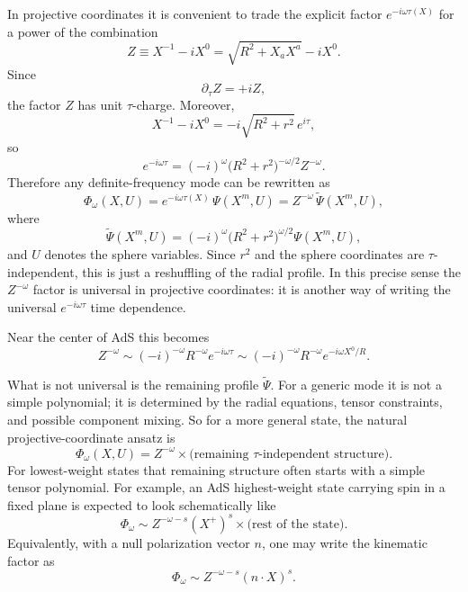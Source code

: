 \documentclass[12pt]{article}
\begin{document}
In projective coordinates it is convenient to trade the explicit factor $e^{-i\omega\tau(X)}$ for a power
of the combination
\begin{equation}
Z\equiv X^{-1}-iX^0=\sqrt{R^2+X_aX^a}-iX^0.
\end{equation}
Since
\begin{equation}
\partial_\tau Z=+iZ,
\end{equation}
the factor $Z$ has unit $\tau$-charge.  Moreover,
\begin{equation}
X^{-1}-iX^0=-i\sqrt{R^2+r^2}\,e^{i\tau},
\end{equation}
so
\begin{equation}
e^{-i\omega\tau}
=
(-i)^\omega \big(R^2+r^2\big)^{-\omega/2} Z^{-\omega}.
\end{equation}
Therefore any definite-frequency mode can be rewritten as
\begin{equation}
\Phi_\omega(X,U)=e^{-i\omega\tau(X)}\,\Psi(X^m,U)
=
Z^{-\omega}\,\widetilde\Psi(X^m,U),
\end{equation}
where
\begin{equation}
\widetilde\Psi(X^m,U)=(-i)^\omega \big(R^2+r^2\big)^{\omega/2}\Psi(X^m,U),
\end{equation}
and $U$ denotes the sphere variables.  Since $r^2$ and the sphere coordinates are $\tau$-independent,
this is just a reshuffling of the radial profile.  In this precise sense the $Z^{-\omega}$ factor is
universal in projective coordinates: it is another way of writing the universal $e^{-i\omega\tau}$ time
dependence.

Near the center of AdS this becomes
\begin{equation}
Z^{-\omega}\sim (-i)^{-\omega}R^{-\omega}e^{-i\omega\tau}
\sim (-i)^{-\omega}R^{-\omega}e^{-i\omega X^0/R}.
\end{equation}

What is not universal is the remaining profile $\widetilde\Psi$.  For a generic mode it is not a simple
polynomial; it is determined by the radial equations, tensor constraints, and possible component mixing.
So for a more general state, the natural projective-coordinate ansatz is
\begin{equation}
\Phi_\omega(X,U)=Z^{-\omega}\times \text{(remaining $\tau$-independent structure)}.
\end{equation}
For lowest-weight states that remaining structure often starts with a simple tensor polynomial.  For
example, an AdS highest-weight state carrying spin in a fixed plane is expected to look schematically like
\begin{equation}
\Phi_\omega \sim Z^{-\omega-s}(X^+)^s \times \text{(rest of the state)}.
\end{equation}
Equivalently, with a null polarization vector $n$, one may write the kinematic factor as
\begin{equation}
\Phi_\omega \sim Z^{-\omega-s}(n\cdot X)^s.
\end{equation}
\end{document}
